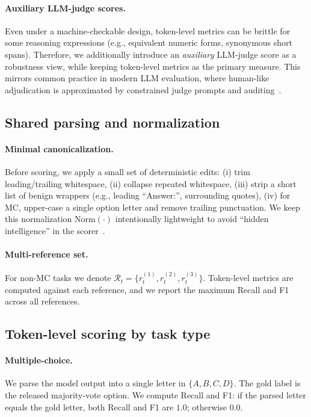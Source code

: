 \paragraph{Auxiliary LLM-judge scores.}
Even under a machine-checkable design, token-level metrics can be brittle for some reasoning expressions (e.g., equivalent numeric forms, synonymous short spans). Therefore, we additionally introduce an \emph{auxiliary} LLM-judge score as a robustness view, while keeping token-level metrics as the primary measure.
This mirrors common practice in modern LLM evaluation, where human-like adjudication is approximated by constrained judge prompts and auditing~\citep{zheng-etal-2023-judging,chiang-etal-2024-chatbotarena,laskar-etal-2024-systematic,deng-etal-2024-investigating}.

\subsection{Shared parsing and normalization}
\label{app:scoring_normalize}

\paragraph{Minimal canonicalization.}
Before scoring, we apply a small set of deterministic edits:
(i) trim leading/trailing whitespace,
(ii) collapse repeated whitespace,
(iii) strip a short list of benign wrappers (e.g., leading ``Answer:'', surrounding quotes),
(iv) for MC, upper-case a single option letter and remove trailing punctuation.
We keep this normalization $\mathrm{Norm}(\cdot)$ intentionally lightweight to avoid ``hidden intelligence'' in the scorer~\citep{liang2022helm}.

\paragraph{Multi-reference set.}
For non-MC tasks we denote $\mathcal{R}_t=\{r_t^{(1)},r_t^{(2)},r_t^{(3)}\}$.
Token-level metrics are computed against each reference, and we report the maximum Recall and F1 across all references.

\subsection{Token-level scoring by task type}
\label{app:scoring_token}

\paragraph{Multiple-choice.}
We parse the model output into a single letter in $\{A,B,C,D\}$.
The gold label is the released majority-vote option.
We compute Recall and F1: if the parsed letter equals the gold letter, both Recall and F1 are $1.0$; otherwise $0.0$.

